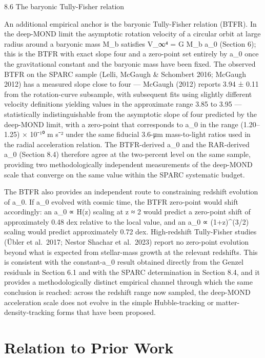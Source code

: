\documentclass[11pt]{article}
\begin{document}
8.6 The baryonic Tully-Fisher relation

An additional empirical anchor is the baryonic Tully-Fisher relation (BTFR). In the deep-MOND limit the asymptotic rotation velocity of a circular orbit at large radius around a baryonic mass M\_b satisfies V\_∞⁴ = G M\_b a\_0 (Section 6); this is the BTFR with exact slope four and a zero-point set entirely by a\_0 once the gravitational constant and the baryonic mass have been fixed. The observed BTFR on the SPARC sample (Lelli, McGaugh \& Schombert 2016; McGaugh 2012) has a measured slope close to four --- McGaugh (2012) reports 3.94 ± 0.11 from the rotation-curve subsample, with subsequent fits using slightly different velocity definitions yielding values in the approximate range 3.85 to 3.95 --- statistically indistinguishable from the asymptotic slope of four predicted by the deep-MOND limit, with a zero-point that corresponds to a\_0 in the range (1.20--1.25) × 10⁻¹⁰ m s⁻² under the same fiducial 3.6-μm mass-to-light ratios used in the radial acceleration relation. The BTFR-derived a\_0 and the RAR-derived a\_0 (Section 8.4) therefore agree at the two-percent level on the same sample, providing two methodologically independent measurements of the deep-MOND scale that converge on the same value within the SPARC systematic budget.

The BTFR also provides an independent route to constraining redshift evolution of a\_0. If a\_0 evolved with cosmic time, the BTFR zero-point would shift accordingly: an a\_0 ∝ H(z) scaling at z ≈ 2 would predict a zero-point shift of approximately 0.48 dex relative to the local value, and an a\_0 ∝ (1+z)\^{}(3/2) scaling would predict approximately 0.72 dex. High-redshift Tully-Fisher studies (Übler et al.~2017; Nestor Shachar et al.~2023) report no zero-point evolution beyond what is expected from stellar-mass growth at the relevant redshifts. This is consistent with the constant-a\_0 result obtained directly from the Genzel residuals in Section 6.1 and with the SPARC determination in Section 8.4, and it provides a methodologically distinct empirical channel through which the same conclusion is reached: across the redshift range now sampled, the deep-MOND acceleration scale does not evolve in the simple Hubble-tracking or matter-density-tracking forms that have been proposed.

\section{Relation to Prior Work}\label{relation-to-prior-work}
\end{document}
